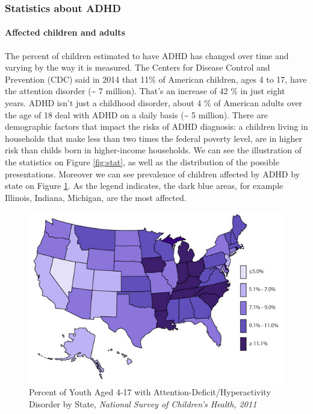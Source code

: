 \documentclass[letterpaper,10pt]{article}
\begin{document}
\subsubsection{Statistics about ADHD}

\paragraph{Affected children and adults}

The percent of children estimated to have ADHD has changed over time and varying by the way it is measured. The Centers for Disease Control and Prevention (CDC) said in 2014 that 11\% of American children, ages 4 to 17, have the attention disorder (\~{} 7 million).  That’s an increase of 42 \% in just eight years. ADHD isn’t just a childhood disorder, about 4 \% of American adults over the age of 18 deal with ADHD on a daily basis (\~{} 5 million). There are demographic factors that impact the risks of ADHD diagnosis: a children living in households that make less than two times the federal poverty level, are in higher risk than childs born in higher-income households. \cite{healthline_adhd} We can see the illustration of the statistics on Figure \ref{fig:stat}, as well as the distribution of the possible presentations. Moreover we can see prevalence of children affected by ADHD by state on Figure \ref{fig:adhd_map}. As the legend indicates, the dark blue areas, for example Illinois, Indiana, Michigan, are the most affected.

\vspace{4mm}
\begin{figure}[h]
\centering
\includegraphics[scale=0.5]{map.jpg}
\caption[Percent of Youth Aged 4-17 with Attention-Deficit/Hyperactivity Disorder by State]{Percent of Youth Aged 4-17 with Attention-Deficit/Hyperactivity Disorder by State, \textit{National Survey of Children's Health, 2011}}
\label{fig:adhd_map}
\end{figure}
\end{document}
